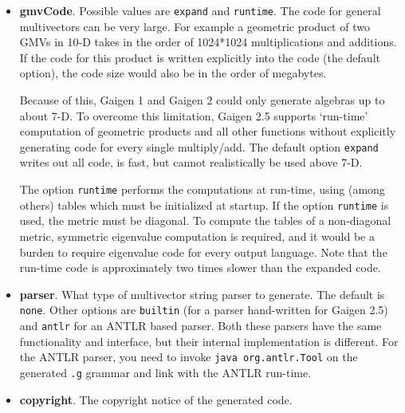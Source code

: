 \documentclass[10pt, a4paper]{article}
\begin{document}
\begin{itemize}
\item {\bf gmvCode}. Possible values are {\tt expand} and {\tt runtime}. 
      The code for general multivectors can be very large. 
      For example a geometric product of two GMVs in 10-D 
      takes in the order of 1024*1024 multiplications and additions.
      If the code for this product is written explicitly into the code (the default option),
      the code size would also be in the order of megabytes. 
      
      Because of this, Gaigen 1 and Gaigen 2 could only generate algebras up to about 7-D.
      To overcome this limitation, Gaigen 2.5 supports `run-time' computation of geometric products and all other functions without explicitly generating
      code for every single multiply/add. The default option {\tt expand} writes out all code, is fast, but cannot realistically be used above 7-D. 
      
      The option {\tt runtime} performs the computations at run-time, using (among others) tables which must be initialized at startup. 
      If the option {\tt runtime} is used, the metric must be diagonal. To compute the tables of a non-diagonal metric,
      symmetric eigenvalue computation is required, and it would be a burden to require eigenvalue code for every output language. 
      Note that the run-time code is approximately two times slower than the expanded code.
      
\item {\bf parser}. What type of multivector string parser to generate. The default is {\tt none}. Other options are
       {\tt builtin} (for a parser hand-written for Gaigen 2.5) and {\tt antlr} for an ANTLR based parser. Both these parsers have the
       same functionality and interface, but their internal implementation is different. For the ANTLR parser, you need to
       invoke {\tt java org.antlr.Tool} on the generated {\tt .g} grammar and link with the ANTLR run-time.
       
\item {\bf copyright}. The copyright notice of the generated code.
\end{itemize}
 
\end{document}
